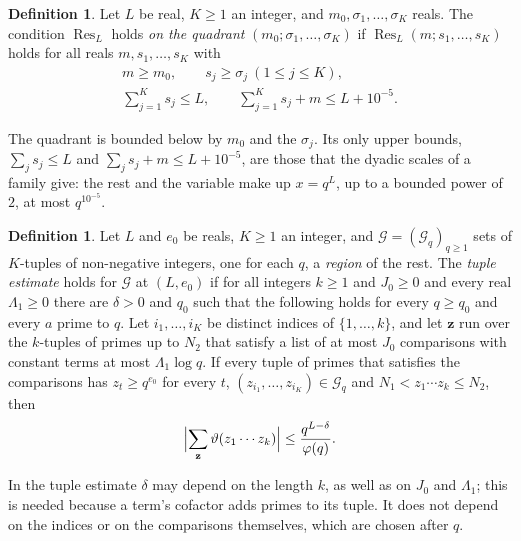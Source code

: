 \documentclass[11pt]{article}
\theoremstyle{definition}
\newtheorem{definition}[theorem]{Definition}
\begin{document}
\begin{definition}\label{def:res-quadrant}
Let $L$ be real, $K \ge 1$ an integer, and $m_0, \sigma_1, \dots, \sigma_K$ reals. The condition
$\operatorname{Res}_L$ holds \emph{on the quadrant} $(m_0; \sigma_1, \dots, \sigma_K)$ if
$\operatorname{Res}_L(m; s_1, \dots, s_K)$ holds for all reals $m, s_1, \dots, s_K$ with
\begin{gather*}
  m \ge m_0, \qquad s_j \ge \sigma_j \ (1 \le j \le K), \\
  \sum_{j = 1}^K s_j \le L, \qquad \sum_{j = 1}^K s_j + m \le L + 10^{-5}.
\end{gather*}
\end{definition}

The quadrant is bounded below by $m_0$ and the $\sigma_j$. Its only upper bounds, $\sum_j s_j \le L$ and $\sum_j s_j +
m \le L + 10^{-5}$, are those that the dyadic scales of a family give: the rest and the variable make up $x = q^L$,
up to a bounded power of $2$, at most $q^{10^{-5}}$.

\begin{definition}\label{def:tuple-estimate}
Let $L$ and $e_0$ be reals, $K \ge 1$ an integer, and $\mathcal G = (\mathcal G_q)_{q \ge 1}$ sets of $K$-tuples of
non-negative integers, one for each $q$, a \emph{region} of the rest. The \emph{tuple estimate}
holds for $\mathcal G$ at $(L, e_0)$ if for all integers $k \ge 1$ and $J_0 \ge 0$ and every real $\Lambda_1 \ge 0$
there
are $\delta > 0$ and $q_0$ such that the following holds for every $q \ge q_0$ and every $a$ prime to $q$. Let $i_1,
\dots, i_K$ be distinct indices of $\{1, \dots, k\}$, and let $\mathbf z$ run over the $k$-tuples of primes up to $N_2$
that satisfy a list of at most $J_0$ comparisons with constant terms at most $\Lambda_1 \log q$. If every tuple of
primes that
satisfies the comparisons has $z_t \ge q^{e_0}$ for every $t$, $(z_{i_1}, \dots, z_{i_K}) \in \mathcal G_q$ and $N_1 <
z_1 \cdots z_k \le N_2$, then
\[
  \Bigl|\sum_{\mathbf z} \vartheta(z_1 \cdots z_k)\Bigr| \le \frac{q^{L - \delta}}{\varphi(q)}.
\]
\end{definition}

In the tuple estimate $\delta$ may depend on the length $k$, as well as on $J_0$ and $\Lambda_1$; this is needed
because a term's cofactor adds primes to its tuple. It does not depend on the indices or on the comparisons
themselves, which are chosen after $q$.
\end{document}
